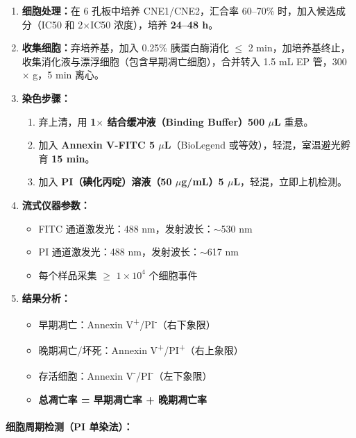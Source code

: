 \documentclass[12pt,a4paper,twoside]{article}
\begin{document}
\begin{enumerate}
  \item \textbf{细胞处理：}在 6 孔板中培养 CNE1/CNE2，汇合率 60--70\% 时，加入候选成分（IC50 和 2$\times$IC50 浓度），培养 \textbf{24--48 h}。
  \item \textbf{收集细胞：}弃培养基，加入 0.25\% 胰蛋白酶消化 $\leq$ 2 min，加培养基终止，收集消化液与漂浮细胞（包含早期凋亡细胞），合并转入 1.5 mL EP 管，300 $\times$ g，5 min 离心。
  \item \textbf{染色步骤：}
    \begin{enumerate}
      \item 弃上清，用 \textbf{1$\times$ 结合缓冲液（Binding Buffer）500 $\mu$L} 重悬。
      \item 加入 \textbf{Annexin V-FITC 5 $\mu$L}（BioLegend 或等效），轻混，室温避光孵育 \textbf{15 min}。
      \item 加入 \textbf{PI（碘化丙啶）溶液（50 $\mu$g/mL）5 $\mu$L}，轻混，立即上机检测。
    \end{enumerate}
  \item \textbf{流式仪器参数：}
    \begin{itemize}
      \item FITC 通道激发光：488 nm，发射波长：$\sim$530 nm
      \item PI 通道激发光：488 nm，发射波长：$\sim$617 nm
      \item 每个样品采集 $\geq$ \textbf{$1 \times 10^4$} 个细胞事件
    \end{itemize}
  \item \textbf{结果分析：}
    \begin{itemize}
      \item 早期凋亡：Annexin V\textsuperscript{+}/PI\textsuperscript{-}（右下象限）
      \item 晚期凋亡/坏死：Annexin V\textsuperscript{+}/PI\textsuperscript{+}（右上象限）
      \item 存活细胞：Annexin V\textsuperscript{-}/PI\textsuperscript{-}（左下象限）
      \item \textbf{总凋亡率 = 早期凋亡率 + 晚期凋亡率}
    \end{itemize}
\end{enumerate}

\paragraph{细胞周期检测（PI 单染法）：}
\end{document}
